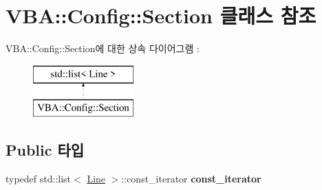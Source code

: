 \hypertarget{class_v_b_a_1_1_config_1_1_section}{}\section{V\+BA\+:\+:Config\+:\+:Section 클래스 참조}
\label{class_v_b_a_1_1_config_1_1_section}
V\+BA\+:\+:Config\+:\+:Section에 대한 상속 다이어그램 \+: \begin{figure}[H]
\begin{center}
\leavevmode
\includegraphics[height=2.000000cm]{class_v_b_a_1_1_config_1_1_section}
\end{center}
\end{figure}
\subsection*{Public 타입}
\begin{DoxyCompactItemize}
\item 
\mbox{\label{class_v_b_a_1_1_config_1_1_section_a79d4303068448425b08175c0d2dacfab}} 
typedef std\+::list$<$ \mbox{\hyperlink{class_v_b_a_1_1_config_1_1_line}{Line}} $>$\+::const\+\_\+iterator {\bfseries const\+\_\+iterator}
\end{DoxyCompactItemize}
